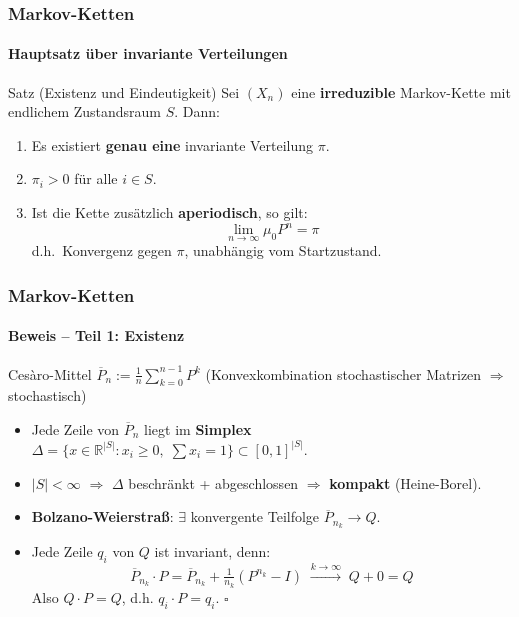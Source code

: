\documentclass{beamer}
\newcommand{\R}{\mathbb{R}}
\begin{document}

\begin{frame}
    \frametitle{Markov-Ketten}
\framesubtitle{Hauptsatz über invariante Verteilungen}
    \begin{block}{Satz (Existenz und Eindeutigkeit)}
Sei $(X_n)$ eine \textbf{irreduzible} Markov-Kette mit endlichem Zustandsraum $S$. Dann:
\begin{enumerate}
\item Es existiert \textbf{genau eine} invariante Verteilung $\pi$.
\item $\pi_i > 0$ für alle $i \in S$.
\item Ist die Kette zusätzlich \textbf{aperiodisch}, so gilt:
\[
\lim_{n \to \infty} \mu_0 P^n = \pi
\]
d.h.\ Konvergenz gegen $\pi$, unabhängig vom Startzustand.
\end{enumerate}
\end{block}
 \end{frame}



\begin{frame}
    \frametitle{Markov-Ketten}
\framesubtitle{Beweis -- Teil 1: Existenz}
    \begin{block}{Cesàro-Mittel}
$\overline{P}_n := \frac{1}{n} \sum_{k=0}^{n-1} P^k$ \quad (Konvexkombination stochastischer Matrizen $\Rightarrow$ stochastisch)
\end{block}
\begin{itemize}
\item Jede Zeile von $\overline{P}_n$ liegt im \textbf{Simplex} $\Delta = \{x \in \R^{|S|} : x_i \geq 0,\; \sum x_i = 1\} \subset [0,1]^{|S|}$.
\item $|S| < \infty$ $\Rightarrow$ $\Delta$ beschränkt + abgeschlossen $\Rightarrow$ \textbf{kompakt} (Heine-Borel).
\item \textbf{Bolzano-Weierstraß}: $\exists$ konvergente Teilfolge $\overline{P}_{n_k} \to Q$.
\item Jede Zeile $q_i$ von $Q$ ist invariant, denn:
\[
\overline{P}_{n_k} \cdot P = \overline{P}_{n_k} + \tfrac{1}{n_k}(P^{n_k} - I) \;\xrightarrow{k\to\infty}\; Q + 0 = Q
\]
Also $Q \cdot P = Q$, d.h. $q_i \cdot P = q_i$. \hfill $\square$
\end{itemize}
 \end{frame}
\end{document}
